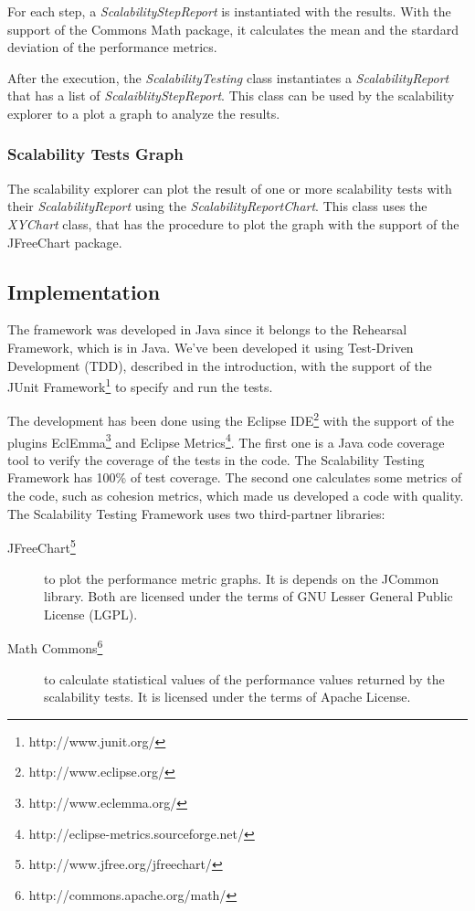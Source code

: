 For each step, a \emph{ScalabilityStepReport} is instantiated with the results. With the support of the Commons Math package, it calculates the mean and the stardard deviation of the performance metrics.

After the execution, the \emph{ScalabilityTesting} class instantiates a \emph{ScalabilityReport} that has a list of \emph{ScalaiblityStepReport}. This class can be used by the scalability explorer to a plot a graph to analyze the results.

\subsubsection{Scalability Tests Graph}
The scalability explorer can plot the result of one or more scalability tests with their \emph{ScalabilityReport} using the \emph{ScalabilityReportChart}. This class uses the \emph{XYChart} class, that has the procedure to plot the graph with the support of the JFreeChart package.


\subsection{Implementation}

The framework was developed in Java since it belongs to the Rehearsal Framework, which is in Java. We've been developed it using Test-Driven Development (TDD), described in the introduction, with the support of the JUnit Framework\footnote{http://www.junit.org/} to specify and run the tests.

The development has been done using the Eclipse IDE\footnote{http://www.eclipse.org/} with the support of the plugins EclEmma\footnote{http://www.eclemma.org/} and Eclipse Metrics\footnote{http://eclipse-metrics.sourceforge.net/}. The first one is a Java code coverage tool to verify the coverage of the tests in the code. The Scalability Testing Framework has 100\% of test coverage. The second one calculates some metrics of the code, such as cohesion metrics, which made us developed a code with quality.\\

The Scalability Testing Framework uses two third-partner libraries:
\begin{description}
\item[JFreeChart\footnote{http://www.jfree.org/jfreechart/}] to plot the performance metric graphs. It is depends on the JCommon library. Both are licensed under the terms of GNU Lesser General Public License (LGPL). 
\item[Math Commons\footnote{http://commons.apache.org/math/}] to calculate statistical values of the performance values returned by the scalability tests. It is licensed under the terms of Apache License.
\end{description}

